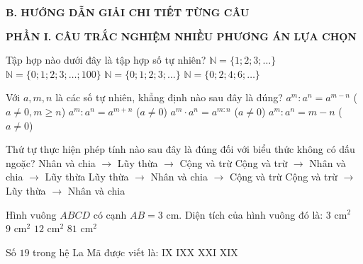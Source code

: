 \documentclass[12pt,a4paper]{article}
\begin{document}
\noindent\textbf{\large B. HƯỚNG DẪN GIẢI CHI TIẾT TỪNG CÂU}
\vspace{2mm}

\noindent\textbf{\large PHẦN I. CÂU TRẮC NGHIỆM NHIỀU PHƯƠNG ÁN LỰA CHỌN}
\vspace{1mm}
\begin{ex}
Tập hợp nào dưới đây là tập hợp số tự nhiên?
\choice
{$\mathbb{N} = \{1; 2; 3; \dots\}$}
{$\mathbb{N} = \{0; 1; 2; 3; \dots; 100\}$}
{\True $\mathbb{N} = \{0; 1; 2; 3; \dots\}$}
{$\mathbb{N} = \{0; 2; 4; 6; \dots\}$}
\end{ex}

\begin{ex}
Với $a, m, n$ là các số tự nhiên, khẳng định nào sau đây là đúng?
\choice
{\True $a^m : a^n = a^{m-n}$ ($a \neq 0, m \geq n$)}
{$a^m : a^n = a^{m+n}$ ($a \neq 0$)}
{$a^m \cdot a^n = a^{m:n}$ ($a \neq 0$)}
{$a^m : a^n = m - n$ ($a \neq 0$)}
\end{ex}

\begin{ex}
Thứ tự thực hiện phép tính nào sau đây là đúng đối với biểu thức không có dấu ngoặc?
\choice
{Nhân và chia $\to$ Lũy thừa $\to$ Cộng và trừ}
{Cộng và trừ $\to$ Nhân và chia $\to$ Lũy thừa}
{\True Lũy thừa $\to$ Nhân và chia $\to$ Cộng và trừ}
{Cộng và trừ $\to$ Lũy thừa $\to$ Nhân và chia}
\end{ex}

\begin{ex}
Hình vuông $ABCD$ có cạnh $AB = 3\text{ cm}$. Diện tích của hình vuông đó là:
\choice
{$3\text{ cm}^2$}
{\True $9\text{ cm}^2$}
{$12\text{ cm}^2$}
{$81\text{ cm}^2$}
\end{ex}

\begin{ex}
Số $19$ trong hệ La Mã được viết là:
\choice
{IX}
{IXX}
{XXI}
{\True XIX}
\end{ex}
\end{document}
